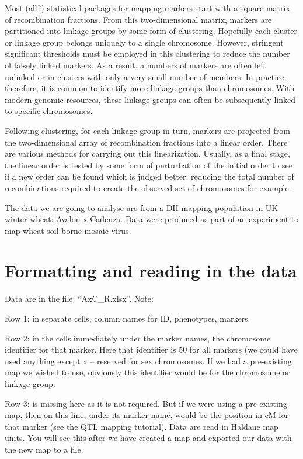 \documentclass[
]{book}
\begin{document}
Most (all?) statistical packages for mapping markers start with a square matrix of recombination fractions. From this two-dimensional matrix, markers are partitioned into linkage groups by some form of clustering. Hopefully each cluster or linkage group belongs uniquely to a single chromosome. However, stringent significant thresholds must be employed in this clustering to reduce the number of falsely linked markers. As a result, a numbers of markers are often left unlinked or in clusters with only a very small number of members. In practice, therefore, it is common to identify more linkage groups than chromosomes. With modern genomic resources, these linkage groups can often be subsequently linked to specific chromosomes.

Following clustering, for each linkage group in turn, markers are projected from the two-dimensional array of recombination fractions into a linear order. There are various methods for carrying out this linearization. Usually, as a final stage, the linear order is tested by some form of perturbation of the initial order to see if a new order can be found which is judged better: reducing the total number of recombinations required to create the observed set of chromosomes for example.

The data we are going to analyse are from a DH mapping population in UK winter wheat: Avalon x Cadenza. Data were produced as part of an experiment to map wheat soil borne mosaic virus.

\hypertarget{formatting-and-reading-in-the-data}{%
\section{Formatting and reading in the data}\label{formatting-and-reading-in-the-data}}

Data are in the file: ``AxC\_R.xlsx''. Note:

Row 1: in separate cells, column names for ID, phenotypes, markers.

Row 2: in the cells immediately under the marker names, the chromosome identifier for
that marker. Here that identifier is 50 for all markers (we could have used anything except x -- reserved for sex chromosomes. If we had a pre-existing map we wished to use, obviously this identifier would be for the chromosome or linkage group.

Row 3: is missing here as it is not required. But if we were using a pre-existing map, then on this line, under its marker name, would be the position in cM for that marker (see
the QTL mapping tutorial). Data are read in Haldane map units. You will see this after
we have created a map and exported our data with the new map to a file.
\end{document}
